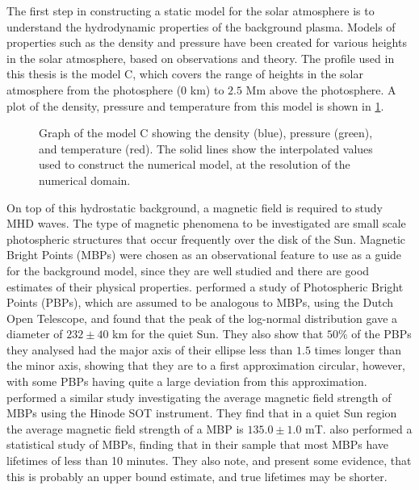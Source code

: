 \documentclass[a4paper,12pt,fourier,authoryear,custommargin]{Classes/PhDThesisPSnPDF}
\begin{document}
The first step in constructing a static model for the solar atmosphere is to understand the hydrodynamic properties of the background plasma.
Models of properties such as the density and pressure have been created for various heights in the solar atmosphere, based on observations and theory.
The profile used in this thesis is the \cite{vernazza1981} model C, which covers the range of heights in the solar atmosphere from the photosphere ($0$ km) to $2.5$ Mm above the photosphere.
A plot of the density, pressure and temperature from this model is shown in \cref{fig:val3c}.



\begin{figure}[h]
    \centering
    \caption{Graph of the \cite{vernazza1981} model C showing the density (blue), pressure (green), and temperature (red). The solid lines show the interpolated values used to construct the numerical model, at the resolution of the numerical domain.}
    \label{fig:val3c}
\end{figure}

On top of this hydrostatic background, a magnetic field is required to study MHD waves.
The type of magnetic phenomena to be investigated are small scale photospheric structures that occur frequently over the disk of the Sun.
Magnetic Bright Points (MBPs) were chosen as an observational feature to use as a guide for the background model, since they are well studied and there are good estimates of their physical properties.
\cite{feng2013} performed a study of Photospheric Bright Points (PBPs), which are assumed to be analogous to MBPs, using the Dutch Open Telescope, and found that the peak of the log-normal distribution gave a diameter of $232\pm40$ km for the quiet Sun.
They also show that $50$\% of the PBPs they analysed had the major axis of their ellipse less than $1.5$ times longer than the minor axis, showing that they are to a first approximation circular, however, with some PBPs having quite a large deviation from this approximation.
\cite{utz2013} performed a similar study investigating the average magnetic field strength of MBPs using the Hinode SOT instrument.
They find that in a quiet Sun region the average magnetic field strength of a MBP is $135.0 \pm 1.0$ mT.
\cite{sanchezalmeida2004} also performed a statistical study of MBPs, finding that in their sample that most MBPs have lifetimes of less than 10 minutes.
They also note, and present some evidence, that this is probably an upper bound estimate, and true lifetimes may be shorter.
\end{document}

